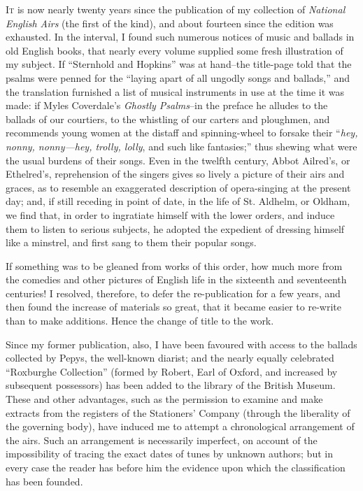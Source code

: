 
\thispagestyle{empty}

\hspace*{\parindent}\textsc{It} is now nearly twenty years since the publication of my collection of 
\textit{National English Airs} (the first of the kind), and about fourteen since the edition
was exhausted. In the interval, I found such numerous notices of music and
ballads in old English books, that nearly every volume supplied some fresh
illustration of my subject. If “Sternhold and Hopkins” was at hand--the
title-page told that the psalms were penned for the “laying apart of all
ungodly songs and ballads,” and the translation furnished a list of musical
instruments in use at the time it was made: if Myles Coverdale’s \textit{Ghostly
Psalms}--in the preface he alludes to the ballads of our courtiers, to the
whistling of our carters and ploughmen, and recommends young women at the
distaff and spinning-wheel to forsake their “\textit{hey, nonny, nonny---hey, trolly, lolly},
and such like fantasies;” thus shewing what were the usual burdens of their
songs. Even in the twelfth century, Abbot Ailred’s, or Ethelred’s, reprehension
of the singers gives so lively a picture of their airs and graces, as to resemble an
exaggerated description of opera-singing at the present day; and, if still receding
in point of date, in the life of St. Aldhelm, or Oldham, we find that, in order to
ingratiate himself with the lower orders, and induce them to listen to serious
subjects, he adopted the expedient of dressing himself like a minstrel, and first
sang to them their popular songs.

If something was to be gleaned from works of this order, how much more from
the comedies and other pictures of English life in the sixteenth and seventeenth
centuries! I resolved, therefore, to defer the re-publication for a few years, and
then found the increase of materials so great, that it became easier to re-write than
to make additions. Hence the change of title to the work.

Since my former publication, also, I have been favoured with access to the
ballads collected by Pepys, the well-known diarist; and the nearly equally celebrated
“Roxburghe Collection” (formed by Robert, Earl of Oxford, and increased
by subsequent possessors) has been added to the library of the British Museum.
These and other advantages, such as the permission to examine and make extracts
from the registers of the Stationers’ Company (through the liberality of the
governing body), have induced me to attempt a chronological arrangement of the
airs. Such an arrangement is necessarily imperfect, on account of the impossibility
of tracing the exact dates of tunes by unknown authors; but in every case
the reader has before him the evidence upon which the classification has been
founded.
\pagebreak

